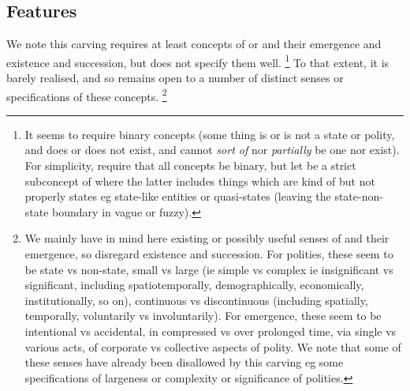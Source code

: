 	\subsection{Features}
	\label{ss:features}
		We note this carving requires at least concepts of  or  and their emergence and existence and succession, but does not specify them well.%
		\footnote{It seems to require binary concepts (some thing is or is not a state or polity, and does or does not exist, and cannot \emph{sort of} nor \emph{partially} be one nor exist). For simplicity, require that all concepts be binary, but let  be a strict subconcept of  where the latter includes things which are kind of but not properly states eg state-like entities or quasi-states (leaving the state-non-state boundary in  vague or fuzzy).} %
		To that extent, it is barely realised, and so remains open to a number of distinct senses or specifications of these concepts.%
		\footnote{We mainly have in mind here existing or possibly useful senses of  and their emergence, so disregard existence and succession. For polities, these seem to be state vs non-state, small vs large (ie simple vs complex ie insignificant vs significant, including spatiotemporally, demographically, economically, institutionally, so on), continuous vs discontinuous (including spatially, temporally, voluntarily vs involuntarily). For emergence, these seem to be intentional vs accidental, in compressed vs over prolonged time, via single vs various acts, of corporate vs collective aspects of polity. We note that some of these senses have already been disallowed by this carving eg some specifications of largeness or complexity or significance of polities.} %
	
